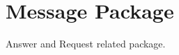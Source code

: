 \hypertarget{group__message}{}\section{Message Package}
\label{group__message}
Answer and Request related package. 